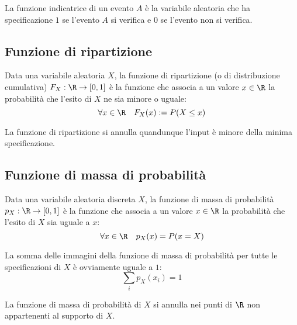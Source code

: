 \begin{defin} \label{def:findiceven}
	La funzione indicatrice di un evento $A$ è la variabile aleatoria che ha specificazione $1$ se l'evento $A$ si verifica e $0$ se l'evento non si verifica.
\end{defin}



\subsection{Funzione di ripartizione}
\begin{defin} \label{def:fripar}
	Data una variabile aleatoria $X$, la funzione di ripartizione (o di distribuzione cumulativa) $F_X:\R\to[0,1]$ è la funzione che associa a un valore $x\in\R$ la probabilità che l'esito di $X$ ne sia minore o uguale:
	\begin{equation*}
		\forall x\in\R\quad F_X(x):=P(X\leq x)
	\end{equation*}
\end{defin}

La funzione di ripartizione si annulla quandunque l'input è minore della minima specificazione.




\subsection{Funzione di massa di probabilità}
\begin{defin} \label{def:fmassaprob}
	Data una variabile aleatoria discreta $X$, la funzione di massa di probabilità $p_X:\R\to[0,1]$ è la funzione che associa a un valore $x\in\R$ la probabilità che l'esito di $X$ sia uguale a $x$:
	\begin{equation*}
		\forall x \in\R\quad p_X(x)= P(x=X)
	\end{equation*}
\end{defin}

La somma delle immagini della funzione di massa di probabilità per tutte le specificazioni di $X$ è ovviamente uguale a $1$:
\begin{equation} \label{eq:sommamassa}
	\sum_i p_X (x_i) = 1
\end{equation}

La funzione di massa di probabilità di $X$ si annulla nei punti di $\R$ non appartenenti al supporto di $X$.

